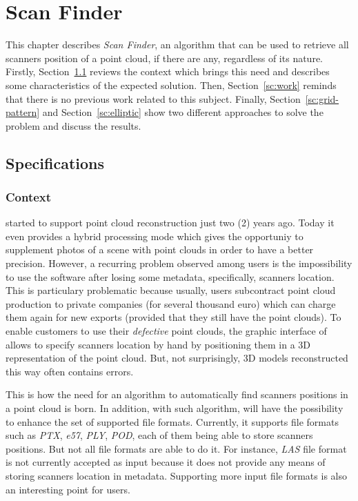 \chapter{Scan Finder}
\label{ch:scanfinder}
This chapter describes \emph{Scan Finder}, an algorithm that can be used to retrieve all scanners position of a point cloud,  if there are any, regardless of its nature. Firstly, Section~\ref{sc:spec} reviews the context which brings this need and describes some characteristics of the expected solution. Then, Section~\ref{sc:work} reminds that there is no previous work related to this subject. Finally, Section~\ref{sc:grid-pattern} and Section~\ref{sc:elliptic} show two different approaches to solve the problem and discuss the results.

\section{Specifications}
\label{sc:spec}
\subsection{Context}
\CC started to support point cloud reconstruction just two (2) years ago. Today it even provides a hybrid processing mode which gives the opportuniy to supplement photos of a scene with point clouds in order to have a better precision. However, a recurring problem observed among \CC users is the impossibility to use the software after losing some metadata, specifically, scanners location. This is particulary problematic because usually, \CC users subcontract point cloud production to private companies (for several thousand euro) which can charge them again for new exports (provided that they still have the point clouds). To enable customers to use their \emph{defective} point clouds, the graphic interface of \CC allows to specify scanners location by hand by positioning them in a 3D representation of the point cloud. But, not surprisingly, 3D models reconstructed this way often contains errors.

This is how the need for an algorithm to automatically find scanners positions in a point cloud is born. In addition, with such algorithm, \CC will have the possibility to enhance the set of supported file formats. Currently, it supports file formats such as \emph{PTX}, \emph{e57}, \emph{PLY}, \emph{POD}, each of them being able to store scanners positions. But not all file formats are able to do it. For instance, \emph{LAS} file format is not currently accepted as input because it does not provide any
means of storing scanners location in metadata. Supporting more input file formats is also an interesting point for \CC users.

